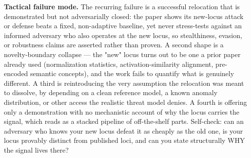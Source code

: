 \begin{tcolorbox}[colback=bgskill!50, colframe=cgreen!70, title={\textbf{C01} \textcolor{gray}{\small (O20/H9/R21)}}, breakable, before skip=4pt, after skip=4pt]
\textbf{Tactical failure mode.} The recurring failure is a successful relocation that is demonstrated but not adversarially closed: the paper shows its new-locus attack or defense beats a fixed, non-adaptive baseline, yet never stress-tests against an informed adversary who also operates at the new locus, so stealthiness, evasion, or robustness claims are asserted rather than proven. A second shape is a novelty-boundary collapse --- the "new" locus turns out to be one a prior paper already used (normalization statistics, activation-similarity alignment, pre-encoded semantic concepts), and the work fails to quantify what is genuinely different. A third is reintroducing the very assumption the relocation was meant to dissolve, by depending on a clean reference model, a known anomaly distribution, or other access the realistic threat model denies. A fourth is offering only a demonstration with no mechanistic account of why the locus carries the signal, which reads as a stacked pipeline of off-the-shelf parts. Self-check: can an adversary who knows your new locus defeat it as cheaply as the old one, is your locus provably distinct from published loci, and can you state structurally WHY the signal lives there?


\end{tcolorbox}
